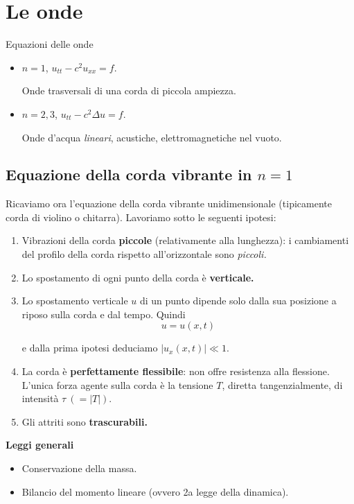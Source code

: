 \documentclass[10pt,a4paper,twoside,openright]{book}
\begin{document}
\chapter{Le onde}

Equazioni delle onde
\begin{itemize}
	\item $\displaystyle n=1$, $\displaystyle u_{tt} -c^{2} u_{xx} =f$.
	      
	      Onde trasversali di una corda di piccola ampiezza.
	\item $\displaystyle n=2,3$, $\displaystyle u_{tt} -c^{2} \Delta u=f$.
	      
	      Onde d'acqua \textit{lineari}, acustiche, elettromagnetiche nel vuoto.
\end{itemize}

\section{Equazione della corda vibrante in \texorpdfstring{$\displaystyle n=1$}{n=1}}

Ricaviamo ora l'equazione della corda vibrante unidimensionale (tipicamente corda di violino o chitarra). Lavoriamo sotto le seguenti ipotesi:
\begin{enumerate}
	\item Vibrazioni della corda \textbf{piccole} (relativamente alla lunghezza): i cambiamenti del profilo della corda rispetto all'orizzontale sono \textit{piccoli.}
	\item Lo spostamento di ogni punto della corda è \textbf{verticale.}
	\item Lo spostamento verticale $\displaystyle u$ di un punto dipende solo dalla sua posizione a riposo sulla corda e dal tempo. Quindi\begin{equation*}
	      u=u( x,t)
	\end{equation*}
	
	e dalla prima ipotesi deduciamo $\displaystyle | u_{x}( x,t)| \ll 1$.
	\item La corda è \textbf{perfettamente flessibile}: non offre resistenza alla flessione. L'unica forza agente sulla corda è la tensione $\displaystyle T$, diretta tangenzialmente, di intensità $\displaystyle \tau \ ( =| T| )$.
	\item Gli attriti sono \textbf{trascurabili.}
\end{enumerate}



\textbf{Leggi generali}
\begin{itemize}
	\item Conservazione della massa.
	\item Bilancio del momento lineare (ovvero 2a legge della dinamica).
\end{itemize}
\end{document}
